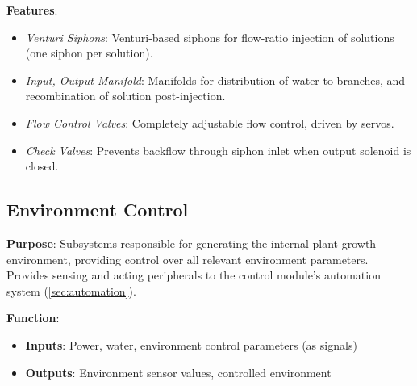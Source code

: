 \documentclass{report}
\begin{document}
\textbf{Features}:
\begin{itemize}
    \item \textit{Venturi Siphons}: Venturi-based siphons for flow-ratio injection of solutions (one siphon per solution).
    \item \textit{Input, Output Manifold}: Manifolds for distribution of water to branches, and recombination of solution post-injection.
    \item \textit{Flow Control Valves}: Completely adjustable flow control, driven by servos.
    \item \textit{Check Valves}: Prevents backflow through siphon inlet when output solenoid is closed.
\end{itemize}


\newpage

\subsection{Environment Control}
\label{sec:environment}

\textbf{Purpose}: Subsystems responsible for generating the internal plant growth environment, providing control over all relevant environment parameters. Provides sensing and acting peripherals to the control module's automation system (\ref{sec:automation}).

\textbf{Function}:
\begin{itemize}
    \item \textbf{Inputs}: Power, water, environment control parameters (as signals)
    \item \textbf{Outputs}: Environment sensor values, controlled environment
\end{itemize}
\end{document}
